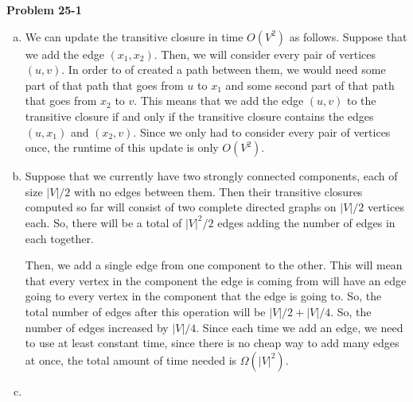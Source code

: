 \documentclass{article}
\begin{document}
\noindent\textbf{Problem 25-1}\\
\begin{enumerate}[a.]
\item
We can update the transitive closure in time $O(V^2)$ as follows. Suppose that we add the edge $(x_1,x_2)$. Then, we will consider every pair of vertices $(u,v)$. In order to of created a path between them, we would need some part of that path that goes from $u$ to $x_1$ and some second part of that path that goes from $x_2$ to $v$. This means that we add the edge $(u,v)$ to the transitive closure if and only if the transitive closure contains the edges $(u,x_1)$ and $(x_2,v)$. Since we only had to consider every pair of vertices once, the runtime of this update is only $O(V^2)$.
\item
Suppose that we currently have two strongly connected components, each of size $|V|/2$ with no edges between them. Then their transitive closures computed so far will consist of two complete directed graphs on $|V|/2$ vertices each. So, there will be a total of $|V|^2/2$ edges adding the number of edges in each together.

Then, we add a single edge from one component to the other. This will mean that every vertex in the component the edge is coming from will have an edge going to every vertex in the component that the edge is going to. So, the total number of edges after this operation will be $|V|/2 +|V|/4$. So, the number of edges increased by $|V|/4$. Since each time we add an edge, we need to use at least constant time, since there is no cheap way to add many edges at once, the total amount of time needed is $\Omega(|V|^2)$.

\item


\end{enumerate}
\end{document}
